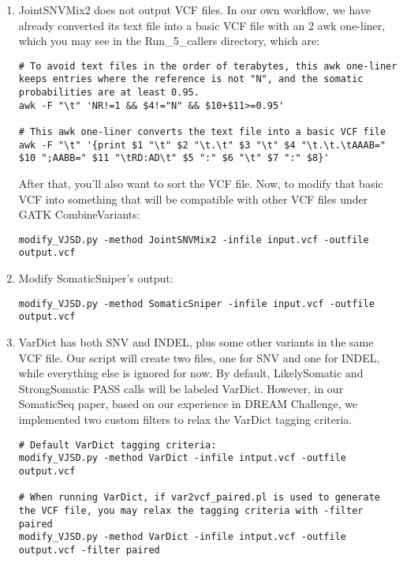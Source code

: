 \documentclass[10pt,letterpaper]{article}
\begin{document}
\begin{sloppypar}
\begin{enumerate}
\item
JointSNVMix2 does not output VCF files. In our own workflow, we have already converted its text file into a basic VCF file with an 2 awk one-liner, which you may see in the Run\_5\_callers directory, which are:

\begin{lstlisting}
# To avoid text files in the order of terabytes, this awk one-liner keeps entries where the reference is not "N", and the somatic probabilities are at least 0.95.
awk -F "\t" 'NR!=1 && $4!="N" && $10+$11>=0.95'
	
# This awk one-liner converts the text file into a basic VCF file
awk -F "\t" '{print $1 "\t" $2 "\t.\t" $3 "\t" $4 "\t.\t.\tAAAB=" $10 ";AABB=" $11 "\tRD:AD\t" $5 ":" $6 "\t" $7 ":" $8}'
\end{lstlisting}
	
After that, you'll also want to sort the VCF file. Now, to modify that basic VCF into something that will be compatible with other VCF files under GATK CombineVariants:
	
\begin{lstlisting}
modify_VJSD.py -method JointSNVMix2 -infile input.vcf -outfile output.vcf
\end{lstlisting}

\item	
Modify SomaticSniper's output:
	
\begin{lstlisting}
modify_VJSD.py -method SomaticSniper -infile input.vcf -outfile output.vcf
\end{lstlisting}
	
	
\item	
VarDict has both SNV and INDEL, plus some other variants in the same VCF file. Our script will create two files, one for SNV and one for INDEL, while everything else is ignored for now. By default, LikelySomatic and StrongSomatic PASS calls will be labeled VarDict. However, in our SomaticSeq paper, based on our experience in DREAM Challenge, we implemented two custom filters to relax the VarDict tagging criteria. 
	
\begin{lstlisting}
# Default VarDict tagging criteria:
modify_VJSD.py -method VarDict -infile intput.vcf -outfile output.vcf
	
# When running VarDict, if var2vcf_paired.pl is used to generate the VCF file, you may relax the tagging criteria with -filter paired
modify_VJSD.py -method VarDict -infile intput.vcf -outfile output.vcf -filter paired
	

\end{lstlisting}
\end{enumerate}
\end{sloppypar}
\end{document}
